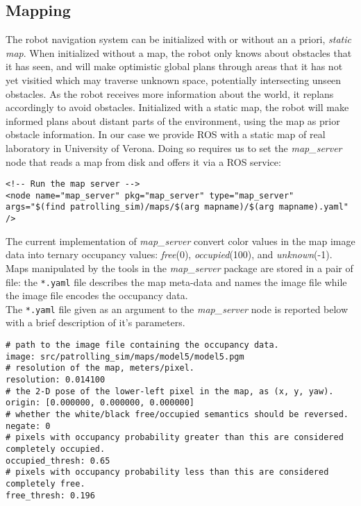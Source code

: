 \subsection{Mapping}
The robot navigation system can be initialized with or without an a priori, \textit{static map}.
When initialized without a map, the robot only knows about obstacles that it has seen,
and will make optimistic global plans through areas that it has not yet visitied
which may traverse unknown space, potentially intersecting unseen obstacles. 
As the robot receives more information about the world, it replans accordingly to
avoid obstacles. Initialized with a static map, the robot will make informed plans 
about distant parts of the environment, using the map as prior obstacle information.
In our case we provide ROS with a static map of real laboratory in University of Verona.
Doing so requires us to set the \textit{map\_server} node that reads a map from 
disk and offers it via a ROS service:
\begin{lstlisting}
<!-- Run the map server -->
<node name="map_server" pkg="map_server" type="map_server" 
args="$(find patrolling_sim)/maps/$(arg mapname)/$(arg mapname).yaml" />
\end{lstlisting}
The current implementation of \textit{map\_server} convert color values in the map 
image data into ternary occupancy values: \textit{free}(0), \textit{occupied}(100), and
\textit{unknown}(-1).
\\
Maps manipulated by the tools in the \textit{map\_server} package are stored in a 
pair of file: the \texttt{*.yaml} file describes the map meta-data and names the image 
file while the image file encodes the occupancy data.
\\
The \texttt{*.yaml} file given as an argument to the \textit{map\_server} node is reported
below with a brief description of it's parameters.
\begin{lstlisting}
# path to the image file containing the occupancy data.
image: src/patrolling_sim/maps/model5/model5.pgm
# resolution of the map, meters/pixel.
resolution: 0.014100
# the 2-D pose of the lower-left pixel in the map, as (x, y, yaw).
origin: [0.000000, 0.000000, 0.000000]
# whether the white/black free/occupied semantics should be reversed.
negate: 0
# pixels with occupancy probability greater than this are considered completely occupied.
occupied_thresh: 0.65
# pixels with occupancy probability less than this are considered completely free.
free_thresh: 0.196
\end{lstlisting}

